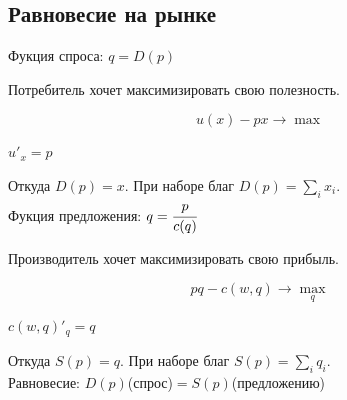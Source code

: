 \documentclass[reqno]{article}
\theoremstyle{definition}
\theoremstyle{definition}
\theoremstyle{definition}
\theoremstyle{definition}
\theoremstyle{definition}
\theoremstyle{definition}
\theoremstyle{definition}
\theoremstyle{definition}
\theoremstyle{definition}
\begin{document}
	\subsection{Равновесие на рынке}
	
	Фукция спроса: $q=D(p)$
	
	Потребитель хочет максимизировать свою полезность.
	
	$$u(x)-px \rightarrow \max$$
	
	$u'_x = p$
	
	Откуда $D(p)= x$. При наборе благ $D(p)= \sum_i x_i$.\\
	
	Фукция предложения: $q=\cfrac{p}{c(q)}$
	
	Производитель хочет максимизировать свою прибыль.
	
	$$pq-c(w,q) \rightarrow \max_q$$
	
	$c(w,q)'_q = q$
	
	Откуда $S(p)= q$. При наборе благ $S(p)= \sum_i q_i$.\\
	
	Равновесие: $D(p)$(спрос)$=S(p)$(предложению)
	
\end{document}
